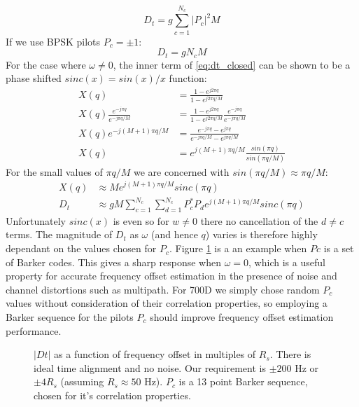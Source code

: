 \documentclass{article}
\begin{document}
\begin{equation}
D_t = g \sum_{c=1}^{N_c} |P_c|^2 M
\end{equation}
If we use BPSK pilots $P_c = \pm 1$:
\begin{equation}
D_t = g N_c M
\end{equation}
For the case where $\omega \ne 0$, the inner term of \ref{eq:dt_closed} can be shown to be a phase shifted $sinc(x)=sin(x)/x$ function:
\begin{equation}
\begin{split}
X(q) &= \frac{1 - e^{j 2 \pi q }}{ 1 - e^{j 2 \pi q/M}} \\
X(q)\frac{e^{-j \pi q}}{e^{-j \pi q / M}} &= \frac{1 - e^{j 2 \pi q }}{ 1 - e^{j 2 \pi q/M}} \frac{e^{-j \pi q}}{e^{-j \pi q / M}} \\
X(q) e^{-j(M+1) \pi q / M } &= \frac{e^{-j \pi q} - e^{j \pi q}}{e^{-j \pi q/M} - e^{j \pi q/M}}  \\
X(q) &= e^{j(M+1) \pi q / M } \frac{sin(\pi q)}{sin(\pi q/M)}
\end{split}
\end{equation}
For the small values of $\pi q/M$ we are concerned with $sin(\pi q/M) \approx \pi q/M$:
\begin{equation}
\begin{split}
X(q) &\approx M e^{j(M+1) \pi q / M } sinc(\pi q) \\
D_t  &\approx gM \sum_{c=1}^{N_c} \sum_{d=1}^{N_c}P^*_c P_d e^{j(M+1) \pi q / M } sinc(\pi q)
\end{split}
\end{equation}
Unfortunately $sinc(x)$ is even so for $w \ne 0$ there no cancellation of the $d \ne c$ terms.  The magnitude of $D_t$ as $\omega$ (and hence $q$) varies is therefore highly dependant on the values chosen for $P_c$.  Figure \ref{fig:acq_dt_q} is a an example when $Pc$ is a set of Barker codes.  This gives a sharp response when $\omega=0$, which is a useful property for accurate frequency offset estimation in the presence of noise and channel distortions such as multipath. For 700D we simply chose random $P_c$ values without consideration of their correlation properties, so employing a Barker sequence for the pilots $P_c$ should improve frequency offset estimation performance.

\begin{figure}[H]
\caption{$|Dt|$ as a function of frequency offset in multiples of $R_s$.  There is ideal time alignment and no noise. Our requirement is $\pm 200$ Hz or $\pm 4R_s$ (assuming $R_s \approx 50$ Hz). $P_c$ is a 13 point Barker sequence, chosen for it's correlation properties.}
\label{fig:acq_dt_q}
\begin{center}

\end{center}
\end{figure}
\end{document}
